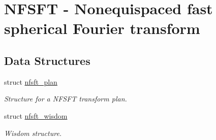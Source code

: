 \hypertarget{group__nfsft}{
\section{NFSFT - Nonequispaced fast spherical Fourier transform}
\label{group__nfsft}
}
\subsection*{Data Structures}
\begin{CompactItemize}
\item 
struct \hyperlink{structnfsft__plan}{nfsft\_\-plan}
\begin{CompactList}\small\item\em Structure for a NFSFT transform plan. \item\end{CompactList}\item 
struct \hyperlink{structnfsft__wisdom}{nfsft\_\-wisdom}
\begin{CompactList}\small\item\em Wisdom structure. \item\end{CompactList}\end{CompactItemize}
